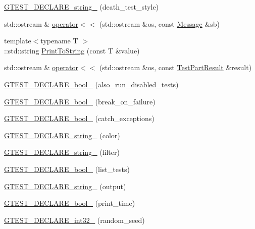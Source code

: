 \begin{DoxyCompactItemize}
\item 
\hyperlink{namespacetesting_a37b7e87f0a5f502c6918f37d1768c1f3}{G\+T\+E\+S\+T\+\_\+\+D\+E\+C\+L\+A\+R\+E\+\_\+string\+\_\+} (death\+\_\+test\+\_\+style)
\item 
std\+::ostream \& \hyperlink{namespacetesting_a7b802e532fd68749765cb7dc156130db}{operator$<$$<$} (std\+::ostream \&os, const \hyperlink{classtesting_1_1_message}{Message} \&sb)
\item 
{\footnotesize template$<$typename T $>$ }\\\+::std\+::string \hyperlink{namespacetesting_aa5717bb1144edd1d262d310ba70c82ed}{Print\+To\+String} (const T \&value)
\item 
std\+::ostream \& \hyperlink{namespacetesting_a7c88897836b9f492190fb2b9dfa3a327}{operator$<$$<$} (std\+::ostream \&os, const \hyperlink{classtesting_1_1_test_part_result}{Test\+Part\+Result} \&result)
\item 
\hyperlink{namespacetesting_a4c08ba9fcb0581c61e25968e520efa48}{G\+T\+E\+S\+T\+\_\+\+D\+E\+C\+L\+A\+R\+E\+\_\+bool\+\_\+} (also\+\_\+run\+\_\+disabled\+\_\+tests)
\item 
\hyperlink{namespacetesting_a5868c3980b2f69f511fc8c3de7cdfc17}{G\+T\+E\+S\+T\+\_\+\+D\+E\+C\+L\+A\+R\+E\+\_\+bool\+\_\+} (break\+\_\+on\+\_\+failure)
\item 
\hyperlink{namespacetesting_ab6f1777f7b740f31e41f7da017447b58}{G\+T\+E\+S\+T\+\_\+\+D\+E\+C\+L\+A\+R\+E\+\_\+bool\+\_\+} (catch\+\_\+exceptions)
\item 
\hyperlink{namespacetesting_a0f658c915a1e60996a2ab00a06612723}{G\+T\+E\+S\+T\+\_\+\+D\+E\+C\+L\+A\+R\+E\+\_\+string\+\_\+} (color)
\item 
\hyperlink{namespacetesting_a20d69860ce843142c7f740262e6b0c9a}{G\+T\+E\+S\+T\+\_\+\+D\+E\+C\+L\+A\+R\+E\+\_\+string\+\_\+} (filter)
\item 
\hyperlink{namespacetesting_af2cd3595c571ca408afc337bc4bb2619}{G\+T\+E\+S\+T\+\_\+\+D\+E\+C\+L\+A\+R\+E\+\_\+bool\+\_\+} (list\+\_\+tests)
\item 
\hyperlink{namespacetesting_a3fe54dd551f1c36cfdd1b36cd6881a44}{G\+T\+E\+S\+T\+\_\+\+D\+E\+C\+L\+A\+R\+E\+\_\+string\+\_\+} (output)
\item 
\hyperlink{namespacetesting_aeccefd463a0942da24750e1bbee76041}{G\+T\+E\+S\+T\+\_\+\+D\+E\+C\+L\+A\+R\+E\+\_\+bool\+\_\+} (print\+\_\+time)
\item 
\hyperlink{namespacetesting_ae754999b59509808254d39e3a3cf38e0}{G\+T\+E\+S\+T\+\_\+\+D\+E\+C\+L\+A\+R\+E\+\_\+int32\+\_\+} (random\+\_\+seed)

\end{DoxyCompactItemize}
